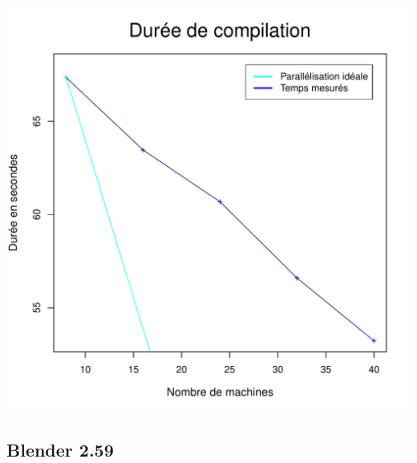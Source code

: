 \documentclass[a4paper, 11pt, titlepage]{article}
\begin{document}
\begin{center}
    \includegraphics[scale=0.55]{res/sujet_makefiles_blender_249_Makefile-recurse_nth1.pdf}
\end{center}


\subsection {Blender 2.59}
\end{document}
